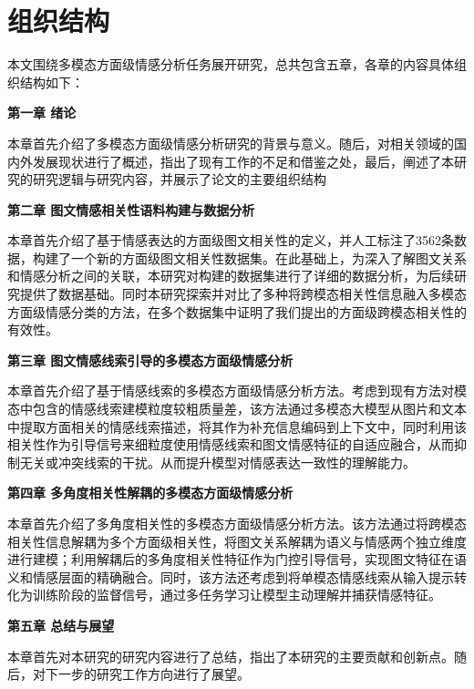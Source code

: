 \section{组织结构}
本文围绕多模态方面级情感分析任务展开研究，总共包含五章，各章的内容具体组织结构如下：

\textbf{第一章 绪论}

本章首先介绍了多模态方面级情感分析研究的背景与意义。随后，对相关领域的国内外发展现状进行了概述，指出了现有工作的不足和借鉴之处，最后，阐述了本研究的研究逻辑与研究内容，并展示了论文的主要组织结构
 
\textbf{第二章 图文情感相关性语料构建与数据分析}

本章首先介绍了基于情感表达的方面级图文相关性的定义，并人工标注了3562条数据，构建了一个新的方面级图文相关性数据集。在此基础上，为深入了解图文关系和情感分析之间的关联，本研究对构建的数据集进行了详细的数据分析，为后续研究提供了数据基础。同时本研究探索并对比了多种将跨模态相关性信息融入多模态方面级情感分类的方法，在多个数据集中证明了我们提出的方面级跨模态相关性的有效性。

\textbf{第三章 图文情感线索引导的多模态方面级情感分析}

本章首先介绍了基于情感线索的多模态方面级情感分析方法。考虑到现有方法对模态中包含的情感线索建模粒度较粗质量差，该方法通过多模态大模型从图片和文本中提取方面相关的情感线索描述，将其作为补充信息编码到上下文中，同时利用该相关性作为引导信号来细粒度使用情感线索和图文情感特征的自适应融合，从而抑制无关或冲突线索的干扰。从而提升模型对情感表达一致性的理解能力。

\textbf{第四章 多角度相关性解耦的多模态方面级情感分析}

本章首先介绍了多角度相关性的多模态方面级情感分析方法。该方法通过将跨模态相关性信息解耦为多个方面级相关性，将图文关系解耦为语义与情感两个独立维度进行建模；利用解耦后的多角度相关性特征作为门控引导信号，实现图文特征在语义和情感层面的精确融合。同时，该方法还考虑到将单模态情感线索从输入提示转化为训练阶段的监督信号，通过多任务学习让模型主动理解并捕获情感特征。


\textbf{第五章 总结与展望}

本章首先对本研究的研究内容进行了总结，指出了本研究的主要贡献和创新点。随后，对下一步的研究工作方向进行了展望。